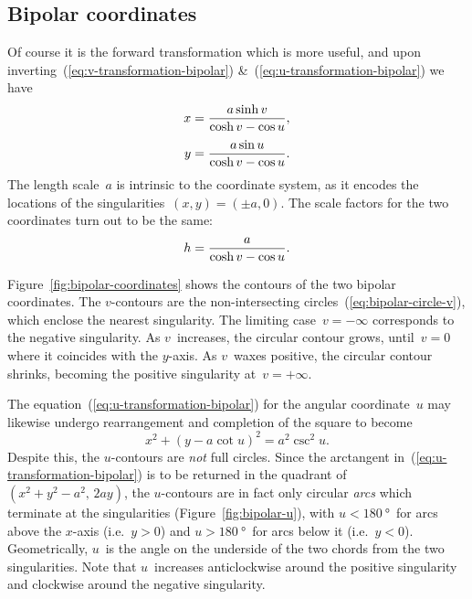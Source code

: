 \subsection{Bipolar coordinates}
\label{sec:bipolar.known.coordinates}

Of course it is the forward transformation which is more useful,
and upon inverting~(\ref{eq:v-transformation-bipolar})
\&~(\ref{eq:u-transformation-bipolar})
we have
\begin{align}
  x &= \frac{a \sinh v}{\cosh v - \cos u},
    \label{eq:x-transformation-bipolar}
    \\[\tallspace]
  y &= \frac{a \sin u}{\cosh v - \cos u}.
    \label{eq:y-transformation-bipolar}
\end{align}
The length scale~$a$ is intrinsic to the coordinate system,
as it encodes the locations of the singularities~$(x, y) = (\pm a, 0)$.
The scale factors for the two coordinates turn out to be the same:
\begin{equation}
  \scalefac = \frac{a}{\cosh v - \cos u}.
  \label{eq:scale-factor-bipolar}
\end{equation}

\begin{figure}
\end{figure}

Figure~\ref{fig:bipolar-coordinates} shows the contours
of the two bipolar coordinates.
The $v$-contours are the non-intersecting circles~(\ref{eq:bipolar-circle-v}),
which enclose the nearest singularity.
The limiting case~$v = -\infty$ corresponds to the negative singularity.
As $v$~increases, the circular contour grows,
until~$v = 0$ where it coincides with the $y$-axis.
As $v$~waxes positive, the circular contour shrinks,
becoming the positive singularity at~$v = +\infty$.

The equation~(\ref{eq:u-transformation-bipolar})
for the angular coordinate~$u$
may likewise undergo rearrangement and completion of the square
to become
\begin{equation}
  x^2 + (y - a \cot u)^2 = a^2 \csc^2 u.
  \label{eq:bipolar-circle-u}
\end{equation}
Despite this, the $u$-contours are \emph{not} full circles.
Since the arctangent in~(\ref{eq:u-transformation-bipolar})
is to be returned in the quadrant of~$(x^2 + y^2 - a^2, \, 2 a y)$,
the $u$-contours are in fact
only circular \emph{arcs} which terminate at the singularities
(Figure~\ref{fig:bipolar-u}),
with $u < \SI{180}{\degree}$~for arcs above the $x$-axis (i.e.~$y > 0$)
and $u > \SI{180}{\degree}$~for arcs below it (i.e.~$y < 0$).
Geometrically, $u$~is the angle on the underside of the two chords
from the two singularities.
Note that $u$~increases anticlockwise around the positive singularity
and clockwise around the negative singularity.

